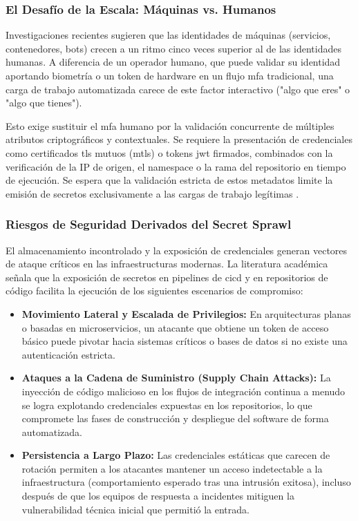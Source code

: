 \documentclass[runningheads]{llncs}
\begin{document}
\subsubsection{El Desafío de la Escala: Máquinas vs. Humanos}

Investigaciones recientes sugieren que las identidades de máquinas (servicios, contenedores, bots) crecen a un ritmo cinco veces superior al de las identidades humanas. A diferencia de un operador humano, que puede validar su identidad aportando biometría o un token de hardware en un flujo \gls{mfa} tradicional, una carga de trabajo automatizada carece de este factor interactivo ("algo que eres" o "algo que tienes").

Esto exige sustituir el \gls{mfa} humano por la validación concurrente de múltiples atributos criptográficos y contextuales. Se requiere la presentación de credenciales como certificados \gls{tls} mutuos (\gls{mtls}) o tokens \gls{jwt} firmados, combinados con la verificación de la IP de origen, el namespace o la rama del repositorio en tiempo de ejecución. Se espera que la validación estricta de estos metadatos limite la emisión de secretos exclusivamente a las cargas de trabajo legítimas \parencite{rfc7519_jwt}.

\subsubsection{Riesgos de Seguridad Derivados del Secret Sprawl}
El almacenamiento incontrolado y la exposición de credenciales generan vectores de ataque críticos en las infraestructuras modernas. La literatura académica señala que la exposición de secretos en pipelines de \gls{cicd} y en repositorios de código facilita la ejecución de los siguientes escenarios de compromiso:

\begin{itemize}
    \item \textbf{Movimiento Lateral y Escalada de Privilegios:} En arquitecturas planas o basadas en microservicios, un atacante que obtiene un token de acceso básico puede pivotar hacia sistemas críticos o bases de datos si no existe una autenticación estricta.
    \item \textbf{Ataques a la Cadena de Suministro (Supply Chain Attacks):} La inyección de código malicioso en los flujos de integración continua a menudo se logra explotando credenciales expuestas en los repositorios, lo que compromete las fases de construcción y despliegue del software de forma automatizada.
    \item \textbf{Persistencia a Largo Plazo:} Las credenciales estáticas que carecen de rotación permiten a los atacantes mantener un acceso indetectable a la infraestructura (comportamiento esperado tras una intrusión exitosa), incluso después de que los equipos de respuesta a incidentes mitiguen la vulnerabilidad técnica inicial que permitió la entrada.
\end{itemize}
\end{document}
